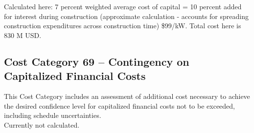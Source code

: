 Calculated here: 7 percent weighted average cost of capital = 10 percent added for interest during 
construction (approximate calculation - accounts for spreading construction expenditures across construction time) \$99/kW. Total cost here is 830 M USD.

\subsection*{Cost Category 69 – Contingency on Capitalized Financial Costs}
This Cost Category includes an assessment of additional cost necessary to achieve the desired confidence level for capitalized financial costs not to be exceeded, including schedule uncertainties.\\

Currently not calculated.



